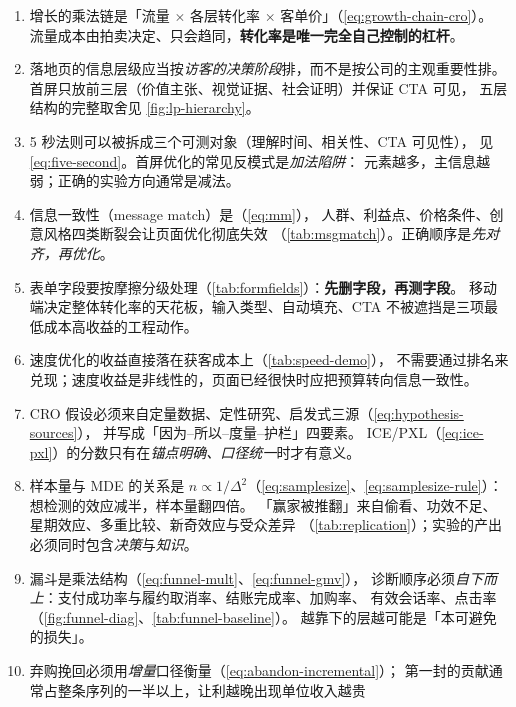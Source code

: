 \begin{keypoint}[本章要点回顾]
\begin{enumerate}
  \item 增长的乘法链是「流量 $\times$ 各层转化率 $\times$ 客单价」（\cref{eq:growth-chain-cro}）。
        流量成本由拍卖决定、只会趋同，\textbf{转化率是唯一完全自己控制的杠杆}。
  \item 落地页的信息层级应当按\emph{访客的决策阶段}排，而不是按公司的主观重要性排。
        首屏只放前三层（价值主张、视觉证据、社会证明）并保证 CTA 可见，
        五层结构的完整取舍见 \cref{fig:lp-hierarchy}。
  \item 5 秒法则可以被拆成三个可测对象（理解时间、相关性、CTA 可见性），
        见 \cref{eq:five-second}。首屏优化的常见反模式是\emph{加法陷阱}：
        元素越多，主信息越弱；正确的实验方向通常是减法。
  \item 信息一致性（message match）是（\cref{eq:mm}），
        人群、利益点、价格条件、创意风格四类断裂会让页面优化彻底失效
        （\cref{tab:msgmatch}）。正确顺序是\emph{先对齐，再优化}。
  \item 表单字段要按摩擦分级处理（\cref{tab:formfields}）：\textbf{先删字段，再测字段}。
        移动端决定整体转化率的天花板，输入类型、自动填充、CTA 不被遮挡是三项最低成本高收益的工程动作。
  \item 速度优化的收益直接落在获客成本上（\cref{tab:speed-demo}），
        不需要通过排名来兑现；速度收益是非线性的，页面已经很快时应把预算转向信息一致性。
  \item CRO 假设必须来自定量数据、定性研究、启发式三源（\cref{eq:hypothesis-sources}），
        并写成「因为--所以--度量--护栏」四要素。
        ICE/PXL（\cref{eq:ice-pxl}）的分数只有在\emph{锚点明确、口径统一}时才有意义。
  \item 样本量与 MDE 的关系是 $n \propto 1/\Delta^2$（\cref{eq:samplesize}、\cref{eq:samplesize-rule}）：
        想检测的效应减半，样本量翻四倍。
        「赢家被推翻」来自偷看、功效不足、星期效应、多重比较、新奇效应与受众差异
        （\cref{tab:replication}）；实验的产出必须同时包含\emph{决策}与\emph{知识}。
  \item 漏斗是乘法结构（\cref{eq:funnel-mult}、\cref{eq:funnel-gmv}），
        诊断顺序必须\emph{自下而上}：支付成功率与履约取消率、结账完成率、加购率、
        有效会话率、点击率（\cref{fig:funnel-diag}、\cref{tab:funnel-baseline}）。
        越靠下的层越可能是「本可避免的损失」。
  \item 弃购挽回必须用\emph{增量}口径衡量（\cref{eq:abandon-incremental}）；
        第一封的贡献通常占整条序列的一半以上，让利越晚出现单位收入越贵

\end{enumerate}
\end{keypoint}
